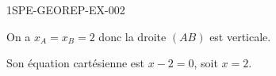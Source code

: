 \begin{corrige}{1SPE-GEOREP-EX-002}


\textbf{} On a $x_A = x_B = 2$ donc la droite $(AB)$ est verticale.

Son équation cartésienne est $\boxed{x - 2 = 0}$, soit $x = 2$.

\end{corrige}
